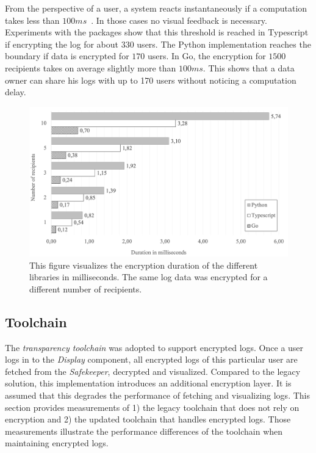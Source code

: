 \documentclass[../main.tex]{subfiles}
\begin{document}
From the perspective of a user, a system reacts instantaneously if a computation takes less than $100ms$~\cite{Nielson1993}.
In those cases no visual feedback is necessary.
Experiments with the packages show that this threshold is reached in Typescript if encrypting the log for about $330$ users.
The Python implementation reaches the boundary if data is encrypted for $170$ users.
In Go, the encryption for $1500$ recipients takes on average slightly more than $100ms$.
This shows that a data owner can share his logs with up to 170 users without noticing a computation delay.


\begin{figure}[ht]
    \includegraphics[scale=0.6]{../img/07/performance.png}
    \centering
    \caption[Encryption duration]{This figure visualizes the encryption duration of the different libraries in milliseconds. The same log data was encrypted for a different number of recipients.}
    \label{fig:performance}
\end{figure}

\subsection{Toolchain}
\label{sec:evaluation-perf-toolchain}
The \emph{transparency toolchain} was adopted to support encrypted logs.
Once a user logs in to the \emph{Display} component, all encrypted logs of this particular user are fetched from the \emph{Safekeeper}, decrypted and visualized.
Compared to the legacy solution, this implementation introduces an additional encryption layer.
It is assumed that this degrades the performance of fetching and visualizing logs.
This section provides measurements of 
1) the legacy toolchain that does not rely on encryption and
2) the updated toolchain that handles encrypted logs.
Those measurements illustrate the performance differences of the toolchain when maintaining encrypted logs.
\end{document}
